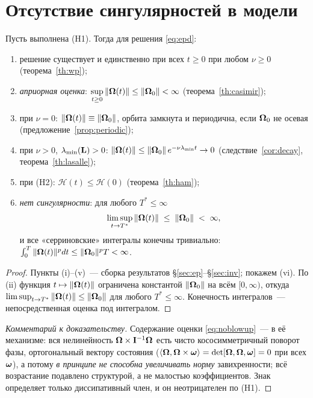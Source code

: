 \needspace{0.25\textheight}
\section{Отсутствие сингулярностей в модели}\label{sec:noblowup}

\begin{theorem}[главная]\label{th:main}
Пусть выполнена \textup{(H1)}. Тогда для решения \eqref{eq:epd}:
\begin{enumerate}[label=\textup{(\roman*)}, leftmargin=2.4em, itemsep=1pt]
  \item решение существует и единственно при всех $t \ge 0$ при любом
        $\nu \ge 0$ (теорема~\ref{th:wp});
  \item \emph{априорная оценка}: $\displaystyle\sup_{t\ge0}\|\boldsymbol{\Omega}(t)\|
        \le \|\boldsymbol{\Omega}_0\| < \infty$ (теорема~\ref{th:casimir});
  \item при $\nu = 0$: $\|\boldsymbol{\Omega}(t)\| \equiv \|\boldsymbol{\Omega}_0\|$, орбита замкнута
        и периодична, если $\boldsymbol{\Omega}_0$ не осевая
        (предложение~\ref{prop:periodic});
  \item при $\nu > 0$, $\lambda_{\min}(\mathbf{L}) > 0$:
        $\|\boldsymbol{\Omega}(t)\| \le \|\boldsymbol{\Omega}_0\|\,e^{-\nu\lambda_{\min}t} \to 0$
        (следствие~\ref{cor:decay}, теорема~\ref{th:lasalle});
  \item при \textup{(H2)}: $\mathcal H(t) \le \mathcal H(0)$
        (теорема~\ref{th:ham});
  \item \emph{нет сингулярности}: для любого $T^{*} \le \infty$
        \begin{equation}\label{eq:noblowup}
          \limsup_{t \to T^{*}} \|\boldsymbol{\Omega}(t)\| \;\le\; \|\boldsymbol{\Omega}_0\| \;<\; \infty ,
        \end{equation}
        и все «серриновские» интегралы конечны тривиально:
        $\int_0^{T}\|\boldsymbol{\Omega}(t)\|^{p}dt \le \|\boldsymbol{\Omega}_0\|^{p}T < \infty$.
\end{enumerate}
\end{theorem}

\begin{proof}
Пункты (i)--(v)~--- сборка результатов \S\ref{sec:ep}--\S\ref{sec:inv};
покажем (vi). По (ii) функция $t \mapsto \|\boldsymbol{\Omega}(t)\|$ ограничена
константой $\|\boldsymbol{\Omega}_0\|$ на всём $[0,\infty)$, откуда
$\limsup_{t\to T^{*}}\|\boldsymbol{\Omega}(t)\| \le \|\boldsymbol{\Omega}_0\|$ для любого
$T^{*} \le \infty$. Конечность интегралов~--- непосредственная
оценка под интегралом.
\end{proof}

\begin{proof}[Комментарий к доказательству]
Содержание оценки \eqref{eq:noblowup}~--- в её механизме: вся
нелинейность $\boldsymbol{\Omega}\times\mathbf{I}^{-1}\boldsymbol{\Omega}$ есть чисто кососимметричный
поворот фазы, ортогональный вектору состояния
($\langle\boldsymbol{\Omega},\boldsymbol{\Omega}\times\boldsymbol{\omega}\rangle = \det[\boldsymbol{\Omega},\boldsymbol{\Omega},\boldsymbol{\omega}] = 0$ при всех
$\boldsymbol{\omega}$), а потому \emph{в принципе не способна увеличивать норму}
завихренности; всё возрастание подавлено структурой, а не малостью
коэффициентов. Знак определяет только диссипативный член, и он
неотрицателен по \textup{(H1)}.
\end{proof}

